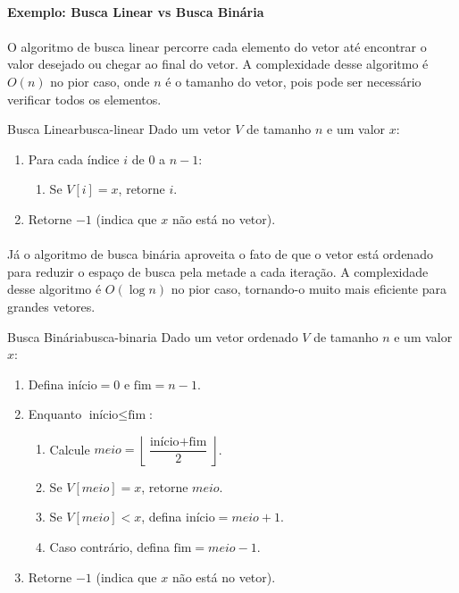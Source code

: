 \documentclass[12pt,a4paper]{article}
\begin{document}
\paragraph{Exemplo: Busca Linear vs Busca Binária}
\paragraph{}
O algoritmo de busca linear percorre cada elemento do vetor até encontrar o valor desejado ou chegar ao final do vetor. A complexidade desse algoritmo é \(O(n)\) no pior caso, onde \(n\) é o tamanho do vetor, pois pode ser necessário verificar todos os elementos.

\begin{algobox}{Busca Linear}{busca-linear}
Dado um vetor \(V\) de tamanho \(n\) e um valor \(x\):
\begin{enumerate}\setlength{\itemsep}{2pt}
    \item Para cada índice \(i\) de \(0\) a \(n - 1\):
    \begin{enumerate}\setlength{\itemsep}{2pt}
        \item Se \(V[i] = x\), retorne \(i\).
    \end{enumerate}
    \item Retorne \(-1\) (indica que \(x\) não está no vetor).
\end{enumerate}
\end{algobox}

\paragraph{}
Já o algoritmo de busca binária aproveita o fato de que o vetor está ordenado para reduzir o espaço de busca pela metade a cada iteração. A complexidade desse algoritmo é \(O(\log n)\) no pior caso, tornando-o muito mais eficiente para grandes vetores.

\begin{algobox}{Busca Binária}{busca-binaria}
Dado um vetor ordenado \(V\) de tamanho \(n\) e um valor \(x\):
\begin{enumerate}\setlength{\itemsep}{2pt}
    \item Defina \(\text{início} = 0\) e \(\text{fim} = n - 1\).
    \item Enquanto \(\text{início} \leq \text{fim}\):
    \begin{enumerate}\setlength{\itemsep}{2pt}
        \item Calcule \(meio = \left\lfloor \dfrac{\text{início} + \text{fim}}{2} \right\rfloor\).
        \item Se \(V[meio] = x\), retorne \(meio\).
        \item Se \(V[meio] < x\), defina \(\text{início} = meio + 1\).
        \item Caso contrário, defina \(\text{fim} = meio - 1\).
    \end{enumerate}
    \item Retorne \(-1\) (indica que \(x\) não está no vetor).
\end{enumerate}
\end{algobox}  
\end{document}
